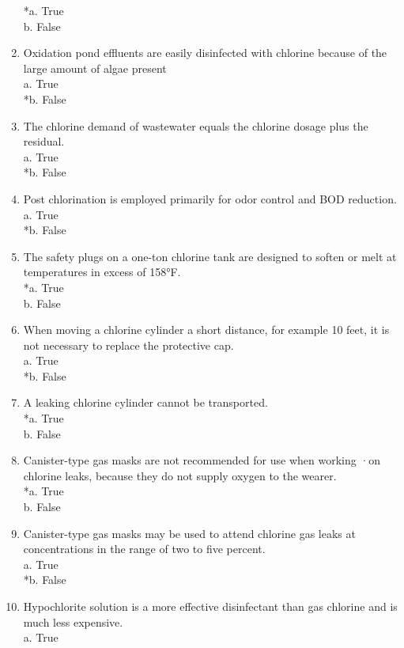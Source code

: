 \begin{enumerate}
*a. True \\
b. False 
\item Oxidation pond effluents are easily disinfected with chlorine because of the large amount of algae present \\
a. True \\
*b. False 
\item The chlorine demand of wastewater equals the chlorine dosage plus the residual. \\
a. True \\
*b. False \\
\item Post chlorination is employed primarily for odor control and BOD reduction. \\
a. True \\
*b. False \\
\item The safety plugs on a one-ton chlorine tank are designed to soften or melt at temperatures in excess of 158°F. \\
*a. True \\
b. False \\
\item When moving a chlorine cylinder a short distance, for example 10 feet, it is not necessary to replace the protective cap. \\
a. True \\
*b. False \\
\item A leaking chlorine cylinder cannot be transported. \\
*a. True \\
b. False \\
\item Canister-type gas masks are not recommended for use when working ·on chlorine leaks, because they do not supply oxygen to the wearer. \\
*a. True \\
b. False \\
\item Canister-type gas masks may be used to attend chlorine gas leaks at concentrations in the range of two to five percent. \\
a. True \\
*b. False \\
\item Hypochlorite solution is a more effective disinfectant than gas chlorine and is much less expensive. \\
a. True \\

\end{enumerate}
